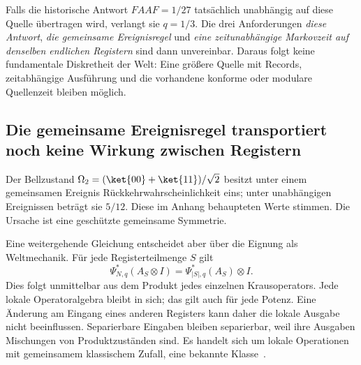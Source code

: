
Falls die historische Antwort $FAAF=1/27$ tatsächlich unabhängig auf diese Quelle übertragen wird, verlangt sie $q=1/3$. Die drei Anforderungen \emph{diese Antwort}, \emph{die gemeinsame Ereignisregel} und \emph{eine zeitunabhängige Markovzeit auf denselben endlichen Registern} sind dann unvereinbar. Daraus folgt keine fundamentale Diskretheit der Welt: Eine größere Quelle mit Records, zeitabhängige Ausführung und die vorhandene konforme oder modulare Quellenzeit bleiben möglich.

\subsection{Die gemeinsame Ereignisregel transportiert noch keine Wirkung zwischen Registern}
Der Bellzustand $\Omega_2=(\ket{00}+\ket{11})/\sqrt2$ besitzt unter einem gemeinsamen Ereignis Rückkehrwahrscheinlichkeit eins; unter unabhängigen Ereignissen beträgt sie $5/12$. Diese im Anhang behaupteten Werte stimmen. Die Ursache ist eine geschützte gemeinsame Symmetrie.

Eine weitergehende Gleichung entscheidet aber über die Eignung als Weltmechanik. Für jede Registerteilmenge $S$ gilt
\begin{equation}\label{eq:nosupportgrowth}
\boxed{\Psi_{N,q}^*(A_S\otimes I)
=\Psi_{|S|,q}^*(A_S)\otimes I.}
\end{equation}
Dies folgt unmittelbar aus dem Produkt jedes einzelnen Krausoperators. Jede lokale Operatoralgebra bleibt in sich; das gilt auch für jede Potenz. Eine Änderung am Eingang eines anderen Registers kann daher die lokale Ausgabe nicht beeinflussen. Separierbare Eingaben bleiben separierbar, weil ihre Ausgaben Mischungen von Produktzuständen sind. Es handelt sich um lokale Operationen mit gemeinsamem klassischem Zufall, eine bekannte Klasse~\cite{gutoskijoint}.


